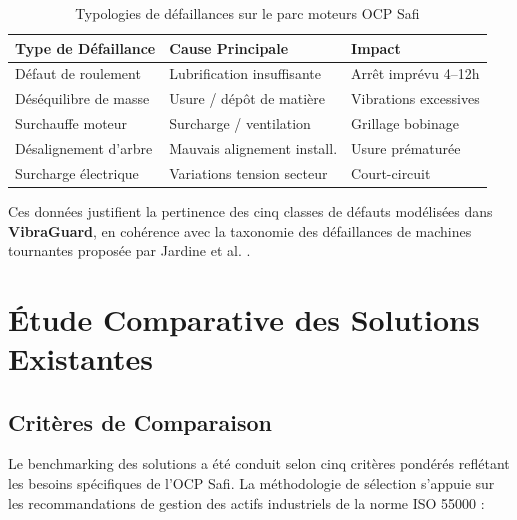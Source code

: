 \documentclass[12pt, a4paper, oneside]{report}
\newcommand{\projectname}{\textbf{VibraGuard}}
\begin{document}
\begin{table}[H]
  \centering
  \begin{tabularx}{\textwidth}{L{4.5cm} L{4cm} L{5.5cm}}
    \toprule
    \textbf{Type de Défaillance} & 
    \textbf{Cause Principale} & 
    \textbf{Impact} \\
    \midrule
    Défaut de roulement & Lubrification insuffisante & Arrêt imprévu 4--12h \\
    Déséquilibre de masse & Usure / dépôt de matière & Vibrations excessives \\
    Surchauffe moteur & Surcharge / ventilation & Grillage bobinage \\
    Désalignement d'arbre & Mauvais alignement install. & Usure prématurée \\
    Surcharge électrique & Variations tension secteur & Court-circuit \\
    \bottomrule
  \end{tabularx}
  \caption{Typologies de défaillances sur le parc moteurs OCP Safi}
\end{table}

Ces données justifient la pertinence des cinq classes de défauts modélisées dans \projectname{},
en cohérence avec la taxonomie des défaillances de machines tournantes proposée par Jardine
et al. \cite{jardine2006}.

\section{Étude Comparative des Solutions Existantes}

\subsection{Critères de Comparaison}

Le benchmarking des solutions a été conduit selon cinq critères pondérés reflétant les besoins
spécifiques de l'OCP Safi. La méthodologie de sélection s'appuie sur les recommandations de
gestion des actifs industriels de la norme ISO 55000 \cite{iso55000} :
\end{document}
